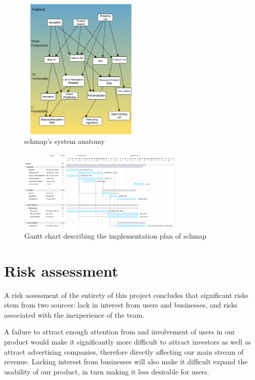 \documentclass[titlepage]{article}
\begin{document}
\begin{figure}[h]
    \centering
    \includegraphics[width=0.5\textwidth]{SystemAnatomy.png}
    \caption{schmap's system anatomy}
    \label{fig:sysanat}
\end{figure}

\begin{figure}[h]
    \centering
    \includegraphics[width=0.7\textwidth]{implementation_plan.png}
    \caption{Gantt chart describing the implementation plan of schmap}
    \label{fig:ganttchart}
\end{figure}




\section{Risk assessment}

A risk assessment of the entirety of this project concludes that significant risks stem from two sources: lack in interest from users and businesses, and risks associated with the inexperience of the team.

A failure to attract enough attention from and involvement of users in our product would make it significantly more difficult to attract investors as well as attract advertising companies, therefore directly affecting our main stream of revenue. Lacking interest from businesses will also make it difficult expand the usability of our product, in turn making it less desirable for users.
\end{document}
